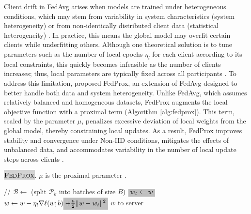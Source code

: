 Client drift in FedAvg arises when models are trained under heterogeneous conditions, which may stem from variability in system characteristics (system heterogeneity) or from non-identically distributed client data (statistical heterogeneity) \citep{fexprox}. In practice, this means the global model may overfit certain clients while underfitting others. Although one theoretical solution is to tune parameters such as the number of local epochs $\eta_l$ for each client according to its local constraints, this quickly becomes infeasible as the number of clients increases; thus, local parameters are typically fixed across all participants \citep{fexprox}. To address this limitation, \cite{fexprox} proposed FedProx, an extension of FedAvg designed to better handle both data and system heterogeneity. Unlike FedAvg, which assumes relatively balanced and homogeneous datasets, FedProx augments the local objective function with a proximal term (Algorithm \ref{alg:fedprox}). This term, scaled by the parameter $\mu$, penalizes excessive deviation of local weights from the global model, thereby constraining local updates. As a result, FedProx improves stability and convergence under Non-IID conditions, mitigates the effects of unbalanced data, and accommodates variability in the number of local update steps across clients \citep{fexprox}.

\begin{algorithm}
  \caption{\colorbox{lightgray}{$\textsc{FedProx}$}. $\mu$ is the proximal parameter \citep{fexprox}.}
\label{alg:fedprox}
\begin{algorithmic}[1]
 \quad // 
    \State $\mathcal{B} \gets$ (split $\mathcal{P}_k$ into batches of size $B$)
    \State $\colorbox{lightgray}{$w_{t} \gets w$}$ 
            \State $w \gets w - \eta_l \nabla \ell(w; b) \colorbox{lightgray}{$+ \frac{\mu}{2} \lVert w - w_t \rVert^{2}$}$
        \EndFor
    \EndFor
    \State \Return $w$ to server
\EndFunction
\end{algorithmic}
\end{algorithm}

